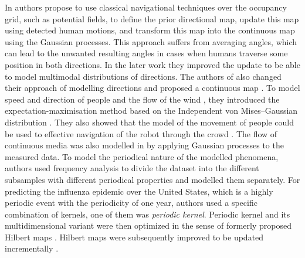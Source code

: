 In \cite{O'Callaghan2011Learning} authors propose to use classical navigational techniques over the occupancy grid, such as potential fields, to define the prior directional map, update this map using detected human motions, and transform this map into the continuous map using the Gaussian processes.
This approach suffers from averaging angles, which can lead to the unwanted resulting angles in cases when humans traverse some position in both directions.
In the later work \cite{McCalman2013MultiModal} they improved the update to be able to model multimodal distributions of directions. 
The authors of \cite{kucner2013conditional} also changed their approach of modelling directions and proposed a continuous map \cite{Kucner2016Tell}.  
To model speed and direction of people and the flow of the wind  \cite{kucner2017enabling}, they introduced the expectation-maximisation method based on the Independent von Mises–Gaussian distribution \cite{roy2012mixture}.
They also showed that the model of the movement of people could be used to effective navigation of the robot through the crowd \cite{palmieri2017kinodynamic}.
The flow of continuous media was also modelled in \cite{Guizilini2015Nonparametric} by applying Gaussian processes \cite{rasmussen2004gaussian} to the measured data.
To model the periodical nature of the modelled phenomena, authors used frequency analysis to divide the dataset into the different subsamples with different periodical properties and modelled them separately.
For predicting the influenza epidemic over the United States, which is a highly periodic event with the periodicity of one year, authors \cite{Senanayake2016Predicting} used a specific combination of kernels, one of them was \textit{periodic kernel}.
Periodic kernel \cite{Tompkins2018Fourier} and its multidimensional variant \cite{Tompkins2018Index} were then optimized in the sense of formerly proposed Hilbert maps \cite{ramos2016hilbert}.
Hilbert maps were subsequently improved to be updated incrementally \cite{Senanayake2017Bayesian}.

